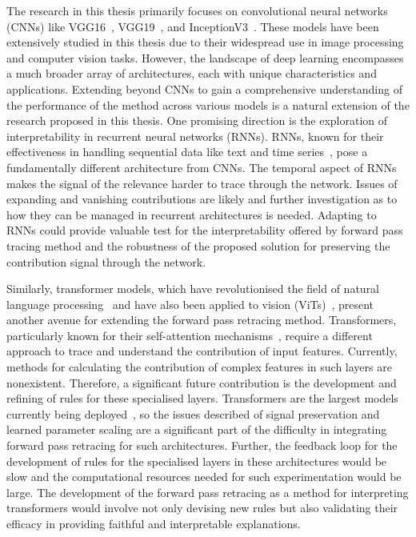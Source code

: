 The research in this thesis primarily focuses on convolutional neural networks (CNNs) like VGG16~\cite{SimonyanZ14a}, VGG19~\cite{SimonyanZ14a}, and InceptionV3~\cite{szegedy2015rethinking}. These models have been extensively studied in this thesis due to their widespread use in image processing and computer vision tasks. However, the landscape of deep learning encompasses a much broader array of architectures, each with unique characteristics and applications. Extending beyond CNNs to gain a comprehensive understanding of the performance of the method across various models is a natural extension of the research proposed in this thesis. One promising direction is the exploration of interpretability in recurrent neural networks (RNNs). RNNs, known for their effectiveness in handling sequential data like text and time series~\cite{10.1162/neco.1997.9.8.1735}, pose a fundamentally different architecture from CNNs. The temporal aspect of RNNs makes the signal of the relevance harder to trace through the network. Issues of expanding and vanishing contributions are likely and further investigation as to how they can be managed in recurrent architectures is needed. Adapting to RNNs could provide valuable test for the interpretability offered by forward pass tracing method and the robustness of the proposed solution for 
preserving the contribution signal through the network.


Similarly, transformer models, which have revolutionised the field of natural language processing~\cite{rothman2021transformers, chernyavskiy2021transformers} and have also been applied to vision (ViTs)~\cite{dosovitskiy2021imageworth16x16words}, present another avenue for extending the forward pass retracing method. Transformers, particularly known for their self-attention mechanisms~\cite{VaswaniSPUJGKP17}, require a different approach to trace and understand the contribution of input features. Currently, methods for calculating the contribution of complex features in such layers are nonexistent. Therefore, a significant future contribution is the development and refining of rules for these specialised layers. Transformers are the largest models currently being deployed~\cite{VaswaniSPUJGKP17}, so the issues described of signal preservation and learned parameter scaling are a significant part of the difficulty in integrating forward pass retracing for such architectures. Further, the feedback loop for the development of rules for the specialised layers in these architectures would be slow and the computational resources needed for such experimentation would be large. The development of the forward pass retracing as a method for interpreting transformers would involve not only devising new rules but also validating their efficacy in providing faithful and interpretable explanations. 

